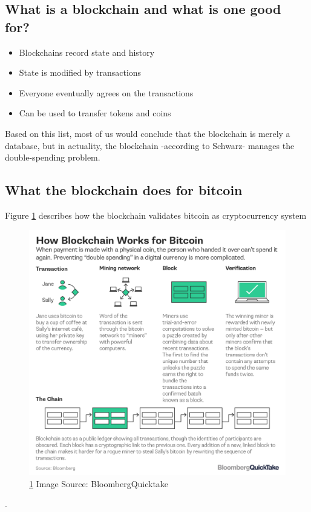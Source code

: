 \documentclass[submission,copyright,creativecommons]{eptcs}
\begin{document}
\subsection{What is a blockchain and what is one good for?}
\begin{itemize}
\item Blockchains record state and history
\item State is modified by transactions
\item Everyone eventually agrees on the transactions
\item Can be used to transfer tokens and coins
\end{itemize}

Based on this list, most of us would conclude that the blockchain is merely a database, but in actuality, the blockchain -according to Schwarz\cite{cppconCppCon2016David}- manages the double-spending problem.

\subsection{What the blockchain does for bitcoin}

Figure \ref{fig:block_bloom} describes how the blockchain validates bitcoin as cryptocurrency system\cite{noauthor_bitcoin}
\begin{figure}[h]
    \centering
    \includegraphics[width=5in]{bitcoin-blockchain-bloomberg}
     \caption{\ref{fig:block_bloom} Image Source: BloombergQuicktake}
     \label{fig:block_bloom}
\end{figure}.
\end{document}
